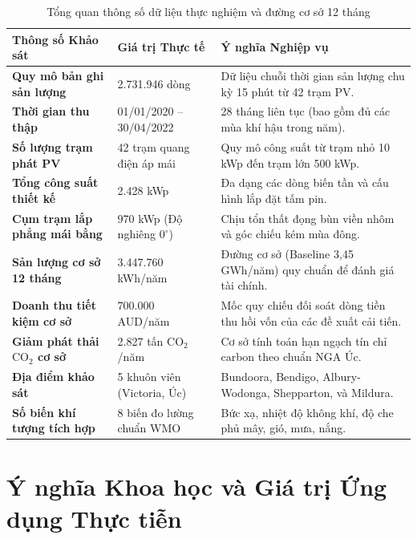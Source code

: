 \documentclass[12pt, a4paper]{report}
\begin{document}
\begin{table}[H]
\centering
\caption{Tổng quan thông số dữ liệu thực nghiệm và đường cơ sở 12 tháng}
\label{tab:dataset_summary}
\small
\renewcommand{\arraystretch}{1.25}
\begin{tabularx}{\textwidth}{@{} l l X @{}}
\toprule
\textbf{Thông số Khảo sát} & \textbf{Giá trị Thực tế} & \textbf{Ý nghĩa Nghiệp vụ} \\
\midrule
\textbf{Quy mô bản ghi sản lượng} & 2.731.946 dòng & Dữ liệu chuỗi thời gian sản lượng chu kỳ 15 phút từ 42 trạm PV. \\
\textbf{Thời gian thu thập} & 01/01/2020 -- 30/04/2022 & 28 tháng liên tục (bao gồm đủ các mùa khí hậu trong năm). \\
\textbf{Số lượng trạm phát PV} & 42 trạm quang điện áp mái & Quy mô công suất từ trạm nhỏ 10 kWp đến trạm lớn 500 kWp. \\
\textbf{Tổng công suất thiết kế} & 2.428 kWp & Đa dạng các dòng biến tần và cấu hình lắp đặt tấm pin. \\
\textbf{Cụm trạm lắp phẳng mái bằng} & 970 kWp (Độ nghiêng $0^\circ$) & Chịu tổn thất đọng bùn viền nhôm và góc chiếu kém mùa đông. \\
\textbf{Sản lượng cơ sở 12 tháng} & 3.447.760 kWh/năm & Đường cơ sở (Baseline 3,45 GWh/năm) quy chuẩn để đánh giá tài chính. \\
\textbf{Doanh thu tiết kiệm cơ sở} & 700.000 AUD/năm & Mốc quy chiếu đối soát dòng tiền thu hồi vốn của các đề xuất cải tiến. \\
\textbf{Giảm phát thải $\text{CO}_2$ cơ sở} & 2.827 tấn $\text{CO}_2$/năm & Cơ sở tính toán hạn ngạch tín chỉ carbon theo chuẩn NGA Úc. \\
\textbf{Địa điểm khảo sát} & 5 khuôn viên (Victoria, Úc) & Bundoora, Bendigo, Albury-Wodonga, Shepparton, và Mildura. \\
\textbf{Số biến khí tượng tích hợp} & 8 biến đo lường chuẩn WMO & Bức xạ, nhiệt độ không khí, độ che phủ mây, gió, mưa, nắng. \\
\bottomrule
\end{tabularx}


\end{table}

\section{Ý nghĩa Khoa học và Giá trị Ứng dụng Thực tiễn}
\label{sec:ynghia}
\end{document}
